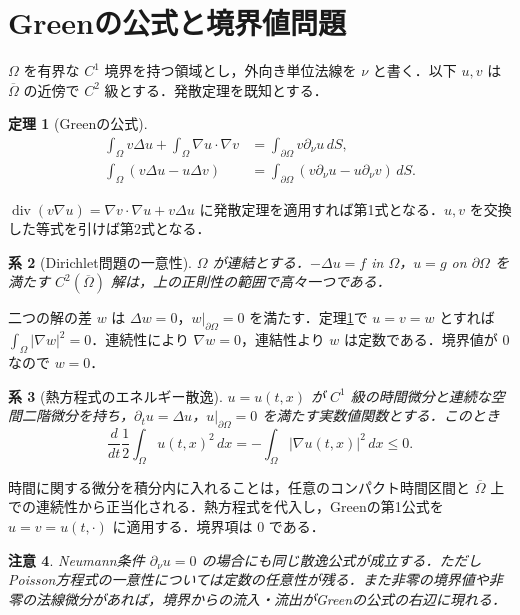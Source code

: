 \documentclass[a5paper,10pt,onecolumn]{jsarticle}
\makeatletter
\theoremstyle{mathnotetheorem}
\newtheorem{theorem}{定理}[section]
\newtheorem{corollary}[theorem]{系}
\newtheorem{remark}[theorem]{注意}
\renewcommand{\proofname}{証明}
\renewenvironment{proof}[1][\proofname]{%
  \par\pushQED{\qed}\normalfont\topsep4\p@\@plus2\p@\relax
  \trivlist\item[\hskip\labelsep\bfseries #1]\ignorespaces
}{\popQED\endtrivlist\@endpefalse}
\makeatother
\begin{document}
\section{Greenの公式と境界値問題}
$\Omega$ を有界な $C^1$ 境界を持つ領域とし，外向き単位法線を $\nu$ と書く．以下 $u,v$ は $\overline\Omega$ の近傍で $C^2$ 級とする．発散定理を既知とする．
\begin{theorem}[Greenの公式]\label{thm:green}
\begin{align*}
 \int_\Omega v\Delta u+\int_\Omega\nabla u\cdot\nabla v
 &=\int_{\partial\Omega}v\partial_\nu u\,dS,\\
 \int_\Omega(v\Delta u-u\Delta v)
 &=\int_{\partial\Omega}(v\partial_\nu u-u\partial_\nu v)\,dS.
\end{align*}
\end{theorem}
\begin{proof}
$\operatorname{div}(v\nabla u)=\nabla v\cdot\nabla u+v\Delta u$ に発散定理を適用すれば第1式となる．$u,v$ を交換した等式を引けば第2式となる．
\end{proof}
\begin{corollary}[Dirichlet問題の一意性]
$\Omega$ が連結とする．$-\Delta u=f$ in $\Omega$，$u=g$ on $\partial\Omega$ を満たす $C^2(\overline\Omega)$ 解は，上の正則性の範囲で高々一つである．
\end{corollary}
\begin{proof}
二つの解の差 $w$ は $\Delta w=0$，$w|_{\partial\Omega}=0$ を満たす．定理\ref{thm:green}で $u=v=w$ とすれば $\int_\Omega|\nabla w|^2=0$．連続性により $\nabla w=0$，連結性より $w$ は定数である．境界値が $0$ なので $w=0$．
\end{proof}
\begin{corollary}[熱方程式のエネルギー散逸]
$u=u(t,x)$ が $C^1$ 級の時間微分と連続な空間二階微分を持ち，$\partial_tu=\Delta u$，$u|_{\partial\Omega}=0$ を満たす実数値関数とする．このとき
\[
 \frac{d}{dt}\frac12\int_\Omega u(t,x)^2\,dx
 =-\int_\Omega|\nabla u(t,x)|^2\,dx\le0.
\]
\end{corollary}
\begin{proof}
時間に関する微分を積分内に入れることは，任意のコンパクト時間区間と $\overline\Omega$ 上での連続性から正当化される．熱方程式を代入し，Greenの第1公式を $u=v=u(t,\cdot)$ に適用する．境界項は $0$ である．
\end{proof}
\begin{remark}
Neumann条件 $\partial_\nu u=0$ の場合にも同じ散逸公式が成立する．ただしPoisson方程式の一意性については定数の任意性が残る．また非零の境界値や非零の法線微分があれば，境界からの流入・流出がGreenの公式の右辺に現れる．
\end{remark}
\end{document}
